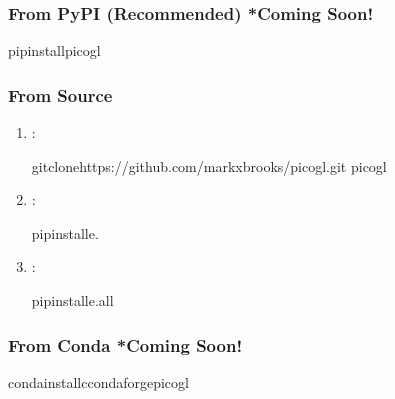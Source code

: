\documentclass[a4paper,10pt,english,openany,oneside]{sphinxmanual}
\begin{document}
\subsubsection{From PyPI (Recommended) {\color{red}\bfseries{}*}Coming Soon!}
\label{\detokenize{installation:from-pypi-recommended-coming-soon}}
\begin{sphinxVerbatim}[commandchars=\\\{\}]
pipinstallpicogl
\end{sphinxVerbatim}


\subsubsection{From Source}
\label{\detokenize{installation:from-source}}\begin{enumerate}
%
\item {} 
\sphinxAtStartPar
{}:

\begin{sphinxVerbatim}[commandchars=\\\{\}]
gitclonehttps://github.com/markxbrooks/picogl.git
picogl
\end{sphinxVerbatim}

\item {} 
\sphinxAtStartPar
{}:

\begin{sphinxVerbatim}[commandchars=\\\{\}]
pipinstall\PYGZhy{}e.
\end{sphinxVerbatim}

\item {} 
\sphinxAtStartPar
{}:

\begin{sphinxVerbatim}[commandchars=\\\{\}]
pipinstall\PYGZhy{}e.\PYG{o}{[}all\PYG{o}{]}
\end{sphinxVerbatim}

\end{enumerate}


\subsubsection{From Conda {\color{red}\bfseries{}*}Coming Soon!}
\label{\detokenize{installation:from-conda-coming-soon}}
\begin{sphinxVerbatim}[commandchars=\\\{\}]
condainstall\PYGZhy{}cconda\PYGZhy{}forgepicogl
\end{sphinxVerbatim}
\end{document}
